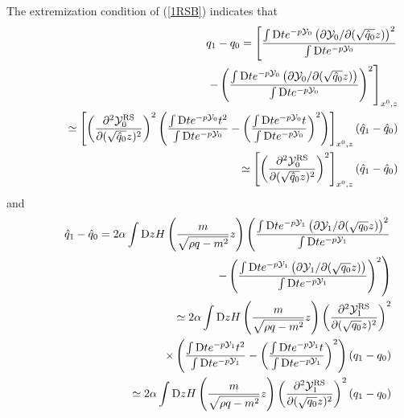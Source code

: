 \documentclass[12pt]{iopart}
\begin{document}
The extremization condition of (\ref{1RSB}) indicates that 
\begin{eqnarray}
&&q_1-q_0=\left [ \frac{\int {\rm D}t e^{-p {\cal Y}_0}
\left (\partial{\cal Y}_0/\partial (\sqrt{\hat{q}_0} z) \right )^2}
{\int {\rm D}t e^{-p {\cal Y}_0}} \right . \cr
&&\hspace*{4cm} \left . -
\left (\frac{\int {\rm D}t e^{-p {\cal Y}_0}
\left (\partial{\cal Y}_0/\partial (\sqrt{\hat{q}_0} z)  \right )}
{\int {\rm D}t e^{-p {\cal Y}_0}} 
\right )^2 \right ]_{x^0,z} \cr
&&\phantom{q_1-q_0} \simeq \left [ \left (\frac{\partial^2 {\cal Y}_0^{\rm RS}}{\partial (\sqrt{\hat{q}_0}z )^2} \right )^2 
\left (\frac{\int {\rm D}t e^{-p {\cal Y}_0} t^2}{\int {\rm D}t e^{-p {\cal Y}_0}}
-\left (\frac{\int {\rm D}t e^{-p {\cal Y}_0} t}{\int {\rm D}t e^{-p {\cal Y}_0}} \right )^2  \right )\right ]_{x^0,z} (\hat{q}_1-\hat{q}_0) \cr
&&\phantom{q_1-q_0} \simeq \left [ \left (\frac{\partial^2 {\cal Y}_0^{\rm RS}}{\partial (\sqrt{\hat{q}_0}z )^2} \right )^2 
\right ]_{x^0,z} (\hat{q}_1-\hat{q}_0) 
\label{AT1}
\end{eqnarray}
and 
\begin{eqnarray}
&&\hat{q}_1-\hat{q}_0=2 \alpha \int {\rm D}z H\left (\frac{m}{\sqrt{\rho q-m^2}}z \right )
\left ( \frac{\int {\rm D}t e^{-p{\cal Y}_1} \left (
\partial{\cal Y}_1/\partial (\sqrt{{q}_0} z) \right )^2}
{\int {\rm D}t e^{-p {\cal Y}_1}} \right . \cr
&&\hspace*{4cm} \left . -
\left (\frac{\int {\rm D}t e^{-p {\cal Y}_1}
\left (\partial{\cal Y}_1/\partial (\sqrt{{q}_0} z)  \right )}
{\int {\rm D}t e^{-p {\cal Y}_1}} 
\right )^2 \right ) \cr
&&\phantom{\hat{q}_1-\hat{q}_0} \simeq 
2 \alpha \int {\rm D}z H\left (\frac{m}{\sqrt{\rho q-m^2}}z \right )
\left (\frac{\partial^2 {\cal Y}_1^{\rm RS}}{\partial (\sqrt{{q}_0}z )^2} \right )^2\cr
&& \hspace*{4cm} 
\times \left (\frac{\int {\rm D}t e^{-p {\cal Y}_1} t^2}{\int {\rm D}t e^{-p {\cal Y}_1}}
-\left (\frac{\int {\rm D}t e^{-p {\cal Y}_1} t}{\int {\rm D}t e^{-p {\cal Y}_1}} \right )^2  \right )
(q_1-q_0)\cr
&&\phantom{\hat{q}_1-\hat{q}_0} \simeq 
2 \alpha \int {\rm D}z H\left (\frac{m}{\sqrt{\rho q-m^2}}z \right )
\left (\frac{\partial^2 {\cal Y}_1^{\rm RS}}{\partial (\sqrt{{q}_0}z )^2} \right )^2 (q_1-q_0)
\label{AT2}
\end{eqnarray}
\end{document}
